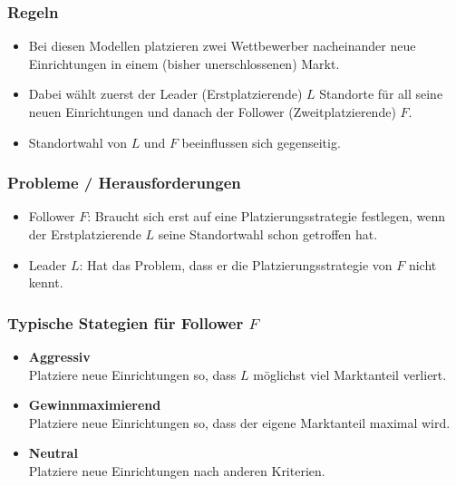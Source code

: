       \subsubsection{Regeln} %
      \label{ssub:regeln}
        \begin{itemize}
          \item Bei diesen Modellen platzieren zwei Wettbewerber nacheinander neue Einrichtungen in einem (bisher unerschlossenen) Markt.
          \item Dabei wählt zuerst der Leader (Erstplatzierende) $L$ Standorte für all seine neuen Einrichtungen und danach der Follower (Zweitplatzierende) $F$.
          \item Standortwahl von $L$ und $F$ beeinflussen sich gegenseitig.
        \end{itemize}

      \subsubsection{Probleme / Herausforderungen} %
      \label{ssub:probleme_herausforderungen}
        \begin{itemize}
          \item Follower $F$: Braucht sich erst auf eine Platzierungsstrategie festlegen, wenn der Erstplatzierende $L$ seine Standortwahl schon getroffen hat.
          \item Leader $L$: Hat das Problem, dass er die Platzierungsstrategie von $F$ nicht kennt.
        \end{itemize}

      \subsubsection{Typische Stategien für Follower $F$} %
      \label{ssub:typische_stategien_für_follower}

        \begin{itemize}
          \item \textbf{Aggressiv}\\
          Platziere neue Einrichtungen so, dass $L$ möglichst viel Marktanteil verliert. 

          \item \textbf{Gewinnmaximierend}\\
          Platziere neue Einrichtungen so, dass der eigene Marktanteil maximal wird.

          \item \textbf{Neutral}\\
          Platziere neue Einrichtungen nach anderen Kriterien.
        \end{itemize}
      
